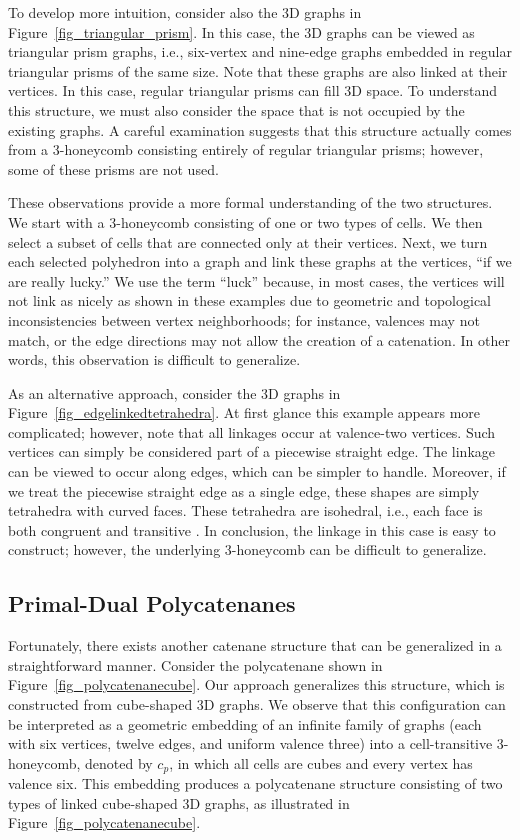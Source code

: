 \documentclass[times,twocolumn,final]{elsarticle}
\begin{document}
To develop more intuition, consider also the 3D graphs in Figure~\ref{fig_triangular_prism}. In this case, the 3D graphs can be viewed as triangular prism graphs, i.e., six-vertex and nine-edge graphs embedded in regular triangular prisms of the same size. Note that these graphs are also linked at their vertices. In this case, regular triangular prisms can fill 3D space. To understand this structure, we must also consider the space that is not occupied by the existing graphs. A careful examination suggests that this structure actually comes from a 3-honeycomb consisting entirely of regular triangular prisms; however, some of these prisms are not used.

These observations provide a more formal understanding of the two structures. We start with a 3-honeycomb consisting of one or two types of cells. We then select a subset of cells that are connected only at their vertices. Next, we turn each selected polyhedron into a graph and link these graphs at the vertices, ``if we are really lucky.'' We use the term ``luck'' because, in most cases, the vertices will not link as nicely as shown in these examples due to geometric and topological inconsistencies between vertex neighborhoods; for instance, valences may not match, or the edge directions may not allow the creation of a catenation. In other words, this observation is difficult to generalize.

As an alternative approach, consider the 3D graphs in Figure~\ref{fig_edgelinkedtetrahedra}. At first glance this example appears more complicated; however, note that all linkages occur at valence-two vertices. Such vertices can simply be considered part of a piecewise straight edge. The linkage can be viewed to occur along edges, which can be simpler to handle. Moreover, if we treat the piecewise straight edge as a single edge, these shapes are simply tetrahedra with curved faces. These tetrahedra are isohedral, i.e., each face is both congruent and transitive \cite{kaplan2022isohedral}. In conclusion, the linkage in this case is easy to construct; however, the underlying 3-honeycomb can be difficult to generalize.


\subsection{Primal-Dual Polycatenanes}

Fortunately, there exists another catenane structure that can be generalized in a straightforward manner. Consider the polycatenane shown in Figure~\ref{fig_polycatenanecube}. Our approach generalizes this structure, which is constructed from cube-shaped 3D graphs. We observe that this configuration can be interpreted as a geometric embedding of an infinite family of graphs (each with six vertices, twelve edges, and uniform valence three) into a cell-transitive 3-honeycomb, denoted by $c_p$, in which all cells are cubes and every vertex has valence six. This embedding produces a polycatenane structure consisting of two types of linked cube-shaped 3D graphs, as illustrated in Figure~\ref{fig_polycatenanecube}.
\end{document}
